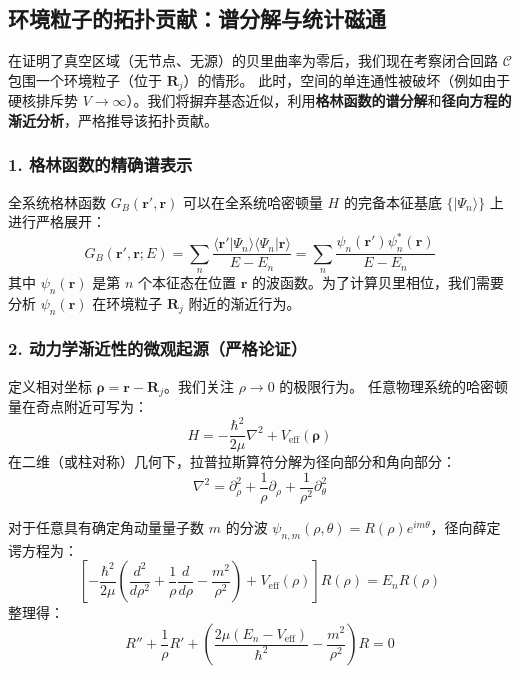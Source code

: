 \documentclass[a4paper,12pt]{article}
\begin{document}
\subsection{环境粒子的拓扑贡献：谱分解与统计磁通}

在证明了真空区域（无节点、无源）的贝里曲率为零后，我们现在考察闭合回路 $\mathcal{C}$ 包围一个环境粒子（位于 $\mathbf{R}_j$）的情形。
此时，空间的单连通性被破坏（例如由于硬核排斥势 $V \to \infty$）。我们将摒弃基态近似，利用\textbf{格林函数的谱分解}和\textbf{径向方程的渐近分析}，严格推导该拓扑贡献。

\subsubsection{1. 格林函数的精确谱表示}

全系统格林函数 $G_B(\mathbf{r}', \mathbf{r})$ 可以在全系统哈密顿量 $H$ 的完备本征基底 $\{|\Psi_n\rangle\}$ 上进行严格展开：
\begin{equation}
    G_B(\mathbf{r}', \mathbf{r}; E) = \sum_n \frac{\langle \mathbf{r}' | \Psi_n \rangle \langle \Psi_n | \mathbf{r} \rangle}{E - E_n} = \sum_n \frac{\psi_n(\mathbf{r}') \psi_n^*(\mathbf{r})}{E - E_n}
    \label{eq:spectral_decomp}
\end{equation}
其中 $\psi_n(\mathbf{r})$ 是第 $n$ 个本征态在位置 $\mathbf{r}$ 的波函数。为了计算贝里相位，我们需要分析 $\psi_n(\mathbf{r})$ 在环境粒子 $\mathbf{R}_j$ 附近的渐近行为。

\subsubsection{2. 动力学渐近性的微观起源（严格论证）}

定义相对坐标 $\boldsymbol{\rho} = \mathbf{r} - \mathbf{R}_j$。我们关注 $\rho \to 0$ 的极限行为。
任意物理系统的哈密顿量在奇点附近可写为：
\begin{equation}
    H = -\frac{\hbar^2}{2\mu} \nabla^2 + V_{\text{eff}}(\boldsymbol{\rho})
\end{equation}
在二维（或柱对称）几何下，拉普拉斯算符分解为径向部分和角向部分：
\begin{equation}
    \nabla^2 = \partial_\rho^2 + \frac{1}{\rho}\partial_\rho + \frac{1}{\rho^2}\partial_\theta^2
\end{equation}

对于任意具有确定角动量量子数 $m$ 的分波 $\psi_{n,m}(\rho, \theta) = R(\rho) e^{im\theta}$，径向薛定谔方程为：
\begin{equation}
    \left[ -\frac{\hbar^2}{2\mu} \left( \frac{d^2}{d\rho^2} + \frac{1}{\rho}\frac{d}{d\rho} - \frac{m^2}{\rho^2} \right) + V_{\text{eff}}(\rho) \right] R(\rho) = E_n R(\rho)
\end{equation}
整理得：
\begin{equation}
    R'' + \frac{1}{\rho}R' + \left( \frac{2\mu(E_n - V_{\text{eff}})}{\hbar^2} - \frac{m^2}{\rho^2} \right) R = 0
\end{equation}
\end{document}
